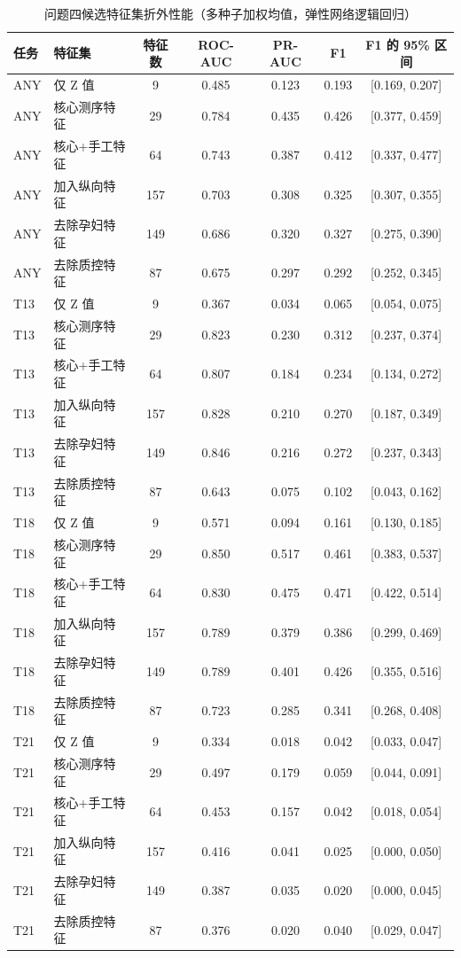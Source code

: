 \begin{table}[!htbp]
  \centering
  \caption{问题四候选特征集折外性能（多种子加权均值，弹性网络逻辑回归）}
  \label{tab:a6}
  \small
  \begin{tabular}{@{}llccccc@{}}
    \toprule
    任务 & 特征集 & 特征数 & ROC-AUC & PR-AUC & F1 & F1 的 95\% 区间 \\
    \midrule
    ANY & 仅 Z 值 & 9 & 0.485 & 0.123 & 0.193 & [0.169, 0.207] \\
    ANY & 核心测序特征 & 29 & 0.784 & 0.435 & 0.426 & [0.377, 0.459] \\
    ANY & 核心+手工特征 & 64 & 0.743 & 0.387 & 0.412 & [0.337, 0.477] \\
    ANY & 加入纵向特征 & 157 & 0.703 & 0.308 & 0.325 & [0.307, 0.355] \\
    ANY & 去除孕妇特征 & 149 & 0.686 & 0.320 & 0.327 & [0.275, 0.390] \\
    ANY & 去除质控特征 & 87 & 0.675 & 0.297 & 0.292 & [0.252, 0.345] \\
    T13 & 仅 Z 值 & 9 & 0.367 & 0.034 & 0.065 & [0.054, 0.075] \\
    T13 & 核心测序特征 & 29 & 0.823 & 0.230 & 0.312 & [0.237, 0.374] \\
    T13 & 核心+手工特征 & 64 & 0.807 & 0.184 & 0.234 & [0.134, 0.272] \\
    T13 & 加入纵向特征 & 157 & 0.828 & 0.210 & 0.270 & [0.187, 0.349] \\
    T13 & 去除孕妇特征 & 149 & 0.846 & 0.216 & 0.272 & [0.237, 0.343] \\
    T13 & 去除质控特征 & 87 & 0.643 & 0.075 & 0.102 & [0.043, 0.162] \\
    T18 & 仅 Z 值 & 9 & 0.571 & 0.094 & 0.161 & [0.130, 0.185] \\
    T18 & 核心测序特征 & 29 & 0.850 & 0.517 & 0.461 & [0.383, 0.537] \\
    T18 & 核心+手工特征 & 64 & 0.830 & 0.475 & 0.471 & [0.422, 0.514] \\
    T18 & 加入纵向特征 & 157 & 0.789 & 0.379 & 0.386 & [0.299, 0.469] \\
    T18 & 去除孕妇特征 & 149 & 0.789 & 0.401 & 0.426 & [0.355, 0.516] \\
    T18 & 去除质控特征 & 87 & 0.723 & 0.285 & 0.341 & [0.268, 0.408] \\
    T21 & 仅 Z 值 & 9 & 0.334 & 0.018 & 0.042 & [0.033, 0.047] \\
    T21 & 核心测序特征 & 29 & 0.497 & 0.179 & 0.059 & [0.044, 0.091] \\
    T21 & 核心+手工特征 & 64 & 0.453 & 0.157 & 0.042 & [0.018, 0.054] \\
    T21 & 加入纵向特征 & 157 & 0.416 & 0.041 & 0.025 & [0.000, 0.050] \\
    T21 & 去除孕妇特征 & 149 & 0.387 & 0.035 & 0.020 & [0.000, 0.045] \\
    T21 & 去除质控特征 & 87 & 0.376 & 0.020 & 0.040 & [0.029, 0.047] \\
    \bottomrule
  \end{tabular}
\end{table}
